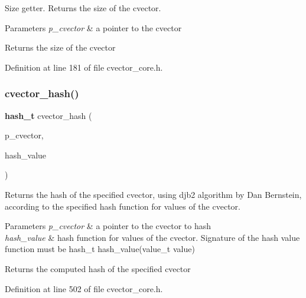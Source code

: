 Size getter. Returns the size of the cvector. 
\begin{DoxyParams}{Parameters}
{\em p\+\_\+cvector} & a pointer to the cvector \\
\hline
\end{DoxyParams}
\begin{DoxyReturn}{Returns}
the size of the cvector 
\end{DoxyReturn}


Definition at line 181 of file cvector\+\_\+core.\+h.

\mbox{\label{cvector__interface_8h_ae5ad5e4e2a0c41c165d3ad1f933916e7}} 
\subsubsection{cvector\+\_\+hash()}
{\footnotesize\ttfamily \textbf{ hash\+\_\+t} cvector\+\_\+hash (\begin{DoxyParamCaption}\item[{\textbf{ cvector} $\ast$}]{p\+\_\+cvector,  }\item[{\textbf{ hash\+\_\+t}($\ast$)(\textbf{ value\+\_\+t})}]{hash\+\_\+value }\end{DoxyParamCaption})}

Returns the hash of the specified cvector, using djb2 algorithm by Dan Bernstein, according to the specified hash function for values of the cvector. 
\begin{DoxyParams}{Parameters}
{\em p\+\_\+cvector} & a pointer to the cvector to hash \\
\hline
{\em hash\+\_\+value} & hash function for values of the cvector. Signature of the hash value function must be hash\+\_\+t hash\+\_\+value(value\+\_\+t value) \\
\hline
\end{DoxyParams}
\begin{DoxyReturn}{Returns}
the computed hash of the specified cvector 
\end{DoxyReturn}


Definition at line 502 of file cvector\+\_\+core.\+h.

\mbox{\label{cvector__interface_8h_a8729382aeac08507d1e6450a23060aa6}} 
